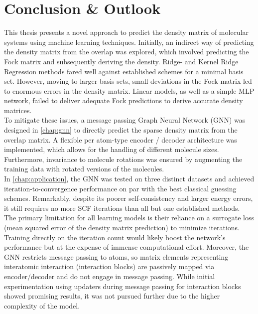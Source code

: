 \chapter{Conclusion \& Outlook}
\label{chap:conclusion}
This thesis presents a novel approach to predict the density matrix of molecular systems using machine learning techniques. 
Initially, an indirect way of predicting the density matrix from the overlap was explored, which involved predicting the Fock matrix and subsequently deriving the density. Ridge- and Kernel Ridge Regression methods fared well against established schemes for a minimal basis set. However, moving to larger basis sets, small deviations in the Fock matrix led to enormous errors in the density matrix. Linear models, as well as a simple MLP network, failed to deliver adequate Fock predictions to derive accurate density matrices.\\
To mitigate these issues, a message passing Graph Neural Network (GNN) was designed in \autoref{chap:gnn} to directly predict the sparse density matrix from the overlap matrix. A flexible per atom-type encoder / decoder architecture was implemented, which allows for the handling of different molecule sizes. Furthermore, invariance to molecule rotations was ensured by augmenting the training data with rotated versions of the molecules. \\
In \autoref{chap:application}, the GNN was tested on three distinct datasets and achieved iteration-to-convergence performance on par with the best classical guessing schemes. Remarkably, despite its poorer self-consistency and larger energy errors, it still requires no more SCF iterations than all but one established methods.\\

The primary limitation for all learning models is their reliance on a surrogate loss (mean squared error of the density matrix prediction) to minimize iterations. Training directly on the iteration count would likely boost the network's performance but at the expense of immense computational effort. Moreover, the GNN restricts message passing to atoms, so matrix elements representing interatomic interaction (interaction blocks) are passively mapped via encoder/decoder and do not engage in message passing. While initial experimentation using updaters during message passing for interaction blocks showed promising results, it was not pursued further due to the higher complexity of the model.\\

